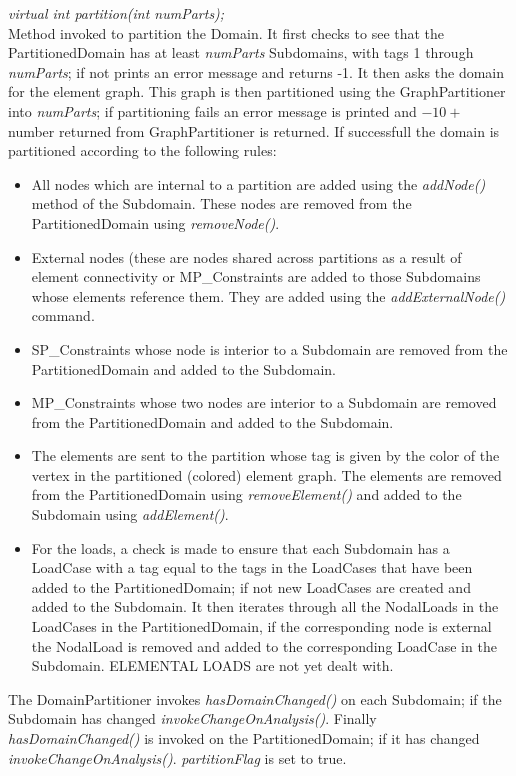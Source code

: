 {\em virtual int partition(int numParts);}\\
Method invoked to partition the Domain. It first checks to see that
the PartitionedDomain has at least {\em numParts} Subdomains, with tags
1 through {\em numParts}; if not prints an error message and returns -1. 
It then asks the domain for the element graph. This graph is then partitioned 
using the GraphPartitioner into {\em numParts}; if partitioning fails an error 
message is printed and  $-10 +$ number returned from GraphPartitioner is
returned. If successfull the domain is partitioned according to the
following rules: \begin{itemize}
\item All nodes which are internal to a partition are added using the
{\em addNode()} method of the Subdomain. These nodes are removed from
the PartitionedDomain using {\em removeNode()}. 
\item External nodes (these are nodes shared across partitions as a
result of element connectivity or MP\_Constraints are added to those
Subdomains whose elements reference them. They are added using the
{\em addExternalNode()} command. 
\item SP\_Constraints whose node is interior to a Subdomain are removed
from the PartitionedDomain and added to the Subdomain. 
\item MP\_Constraints whose two nodes are interior to a Subdomain are
removed from the PartitionedDomain and added to the Subdomain.
\item The elements are sent to the partition whose tag is given by the
color of the vertex in the partitioned (colored) element graph. The
elements are removed from the PartitionedDomain using {\em
removeElement()} and added to the Subdomain using {\em addElement()}.
\item For the loads, a check is made to ensure that each Subdomain has
a LoadCase with a tag equal to the tags in the LoadCases that have
been added to the PartitionedDomain; if not new LoadCases are created
and added to the Subdomain. It then iterates through all the
NodalLoads in the LoadCases in the PartitionedDomain, if the
corresponding node is external the NodalLoad is removed and added to
the corresponding LoadCase in the Subdomain. ELEMENTAL LOADS are not
yet dealt with. 
\end{itemize}

The DomainPartitioner invokes {\em hasDomainChanged()} on each Subdomain; if the Subdomain 
has changed {\em invokeChangeOnAnalysis()}. Finally {\em
hasDomainChanged()} is invoked on the PartitionedDomain; if it has
changed {\em invokeChangeOnAnalysis()}. {\em partitionFlag} is set to
true. \\ 


